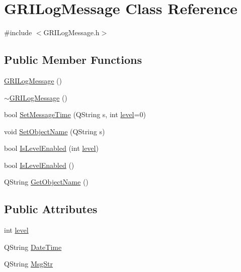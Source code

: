 \hypertarget{classGRILogMessage}{\section{\-G\-R\-I\-Log\-Message \-Class \-Reference}
\label{classGRILogMessage}
}


{\ttfamily \#include $<$\-G\-R\-I\-Log\-Message.\-h$>$}

\subsection*{\-Public \-Member \-Functions}
\begin{DoxyCompactItemize}
\item 
\hyperlink{classGRILogMessage_a761365eb2f41672771fd420c2ce3c30b}{\-G\-R\-I\-Log\-Message} ()
\item 
\hyperlink{classGRILogMessage_a0f0f494c72a6da2339c32870deb3a840}{$\sim$\-G\-R\-I\-Log\-Message} ()
\item 
bool \hyperlink{classGRILogMessage_a742a91a204e70fde29a4a42d7c17974e}{\-Set\-Message\-Time} (\-Q\-String s, int \hyperlink{classGRILogMessage_aec709c2e96c8a305ddc81d8f70b0fa28}{level}=0)
\item 
void \hyperlink{classGRILogMessage_ad5ec128fb2b3336f71abe1ba7dff038a}{\-Set\-Object\-Name} (\-Q\-String s)
\item 
bool \hyperlink{classGRILogMessage_a137fd550f780a88e3ed8674a7ed483bc}{\-Is\-Level\-Enabled} (int \hyperlink{classGRILogMessage_aec709c2e96c8a305ddc81d8f70b0fa28}{level})
\item 
bool \hyperlink{classGRILogMessage_aae70db0ca851d03e2844c1b1022077f1}{\-Is\-Level\-Enabled} ()
\item 
\-Q\-String \hyperlink{classGRILogMessage_a98cb9dfdbdd02eff8a109e20cd66b9a3}{\-Get\-Object\-Name} ()
\end{DoxyCompactItemize}
\subsection*{\-Public \-Attributes}
\begin{DoxyCompactItemize}
\item 
int \hyperlink{classGRILogMessage_aec709c2e96c8a305ddc81d8f70b0fa28}{level}
\item 
\-Q\-String \hyperlink{classGRILogMessage_ae4cd71e75626a3674fe5aafe1e0b7259}{\-Date\-Time}
\item 
\-Q\-String \hyperlink{classGRILogMessage_aa6d3e7887e2d5eb68e374b5a63f1557a}{\-Msg\-Str}
\end{DoxyCompactItemize}

